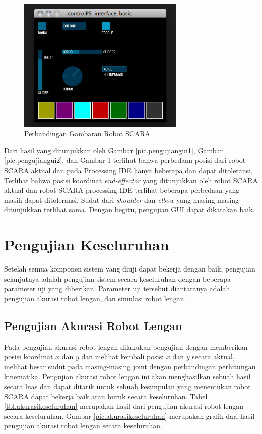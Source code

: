 \begin{figure}[H]
	\centering
	\includegraphics[width=8cm]{gambar/controlp5.jpg}
	\caption{Perbandingan Gambaran Robot SCARA}
	\label{pic.pengujiangui3}
\end{figure}
Dari hasil yang ditunjukkan oleh Gambar \ref{pic.pengujiangui1}, Gambar \ref{pic.pengujiangui2}, dan Gambar \ref{pic.pengujiangui3} terlihat bahwa perbedaan posisi dari robot SCARA aktual dan pada Processing IDE hanya beberapa dan dapat ditoleransi, Terlihat bahwa posisi koordinat\textit{ end-effector }yang ditunjukkan oleh robot SCARA aktual dan robot SCARA processing IDE terlihat beberapa perbedaan yang masih dapat ditoleransi. Sudut dari \textit{shoulder} dan \textit{elbow} yang masing-masing ditunjukkan terlihat sama. Dengan begitu, pengujian GUI dapat dikatakan baik.

\section{Pengujian Keseluruhan}
Setelah semua komponen sistem yang diuji dapat bekerja dengan baik, pengujian selanjutnya adalah pengujian sistem secara keseluruhan dengan beberapa parameter uji yang diberikan. Parameter uji tersebut diantaranya adalah pengujian akurasi robot lengan, dan simulasi robot lengan. 

\subsection{Pengujian Akurasi Robot Lengan}
Pada pengujian akurasi robot lengan dilakukan pengujian dengan memberikan posisi koordinat $x$ dan $y$ dan melihat kembali posisi $x$ dan $y$ secara aktual, melihat besar sudut pada masing-masing joint dengan perbandingan perhitungan kinematika. Pengujian akurasi robot lengan ini akan menghasilkan sebuah hasil secara luas dan dapat ditarik untuk sebuah kesimpulan yang menentukan robot SCARA dapat bekerja baik atau buruk secara keseluruhan. Tabel \ref{tbl.akurasikeseluruhan} merupakan hasil dari pengujian akurasi robot lengan secara keseluruhan. Gambar \ref{pic.akurasikeseluruhan} merupakan grafik dari hasil pengujian akurasi robot lengan secara keseluruhan.


